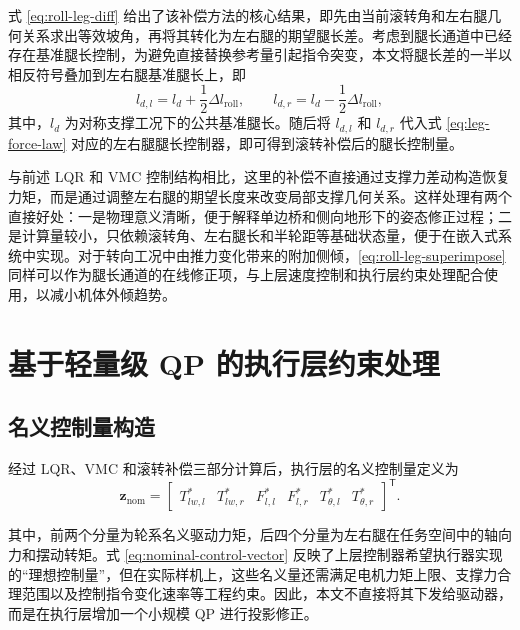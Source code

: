 式 \eqref{eq:roll-leg-diff} 给出了该补偿方法的核心结果，即先由当前滚转角和左右腿几何关系求出等效坡角，再将其转化为左右腿的期望腿长差。考虑到腿长通道中已经存在基准腿长控制，为避免直接替换参考量引起指令突变，本文将腿长差的一半以相反符号叠加到左右腿基准腿长上，即
\begin{equation}
  l_{d,l} = l_d + \frac{1}{2}\Delta l_{\mathrm{roll}},
  \qquad
  l_{d,r} = l_d - \frac{1}{2}\Delta l_{\mathrm{roll}},
  \label{eq:roll-leg-superimpose}
\end{equation}
其中，$l_d$ 为对称支撑工况下的公共基准腿长。随后将 $l_{d,l}$ 和 $l_{d,r}$ 代入式 \eqref{eq:leg-force-law} 对应的左右腿腿长控制器，即可得到滚转补偿后的腿长控制量。

与前述 LQR 和 VMC 控制结构相比，这里的补偿不直接通过支撑力差动构造恢复力矩，而是通过调整左右腿的期望长度来改变局部支撑几何关系。这样处理有两个直接好处：一是物理意义清晰，便于解释单边桥和侧向地形下的姿态修正过程；二是计算量较小，只依赖滚转角、左右腿长和半轮距等基础状态量，便于在嵌入式系统中实现。对于转向工况中由推力变化带来的附加侧倾，\eqref{eq:roll-leg-superimpose} 同样可以作为腿长通道的在线修正项，与上层速度控制和执行层约束处理配合使用，以减小机体外倾趋势。

\section{基于轻量级 QP 的执行层约束处理}

\subsection{名义控制量构造}

经过 LQR、VMC 和滚转补偿三部分计算后，执行层的名义控制量定义为
\begin{equation}
  \boldsymbol{z}_{\mathrm{nom}}
  =
  \begin{bmatrix}
    T_{lw,l}^{\ast} &
    T_{lw,r}^{\ast} &
    F_{l,l}^{\ast} &
    F_{l,r}^{\ast} &
    T_{\theta,l}^{\ast} &
    T_{\theta,r}^{\ast}
  \end{bmatrix}^{\mathsf{T}}.
  \label{eq:nominal-control-vector}
\end{equation}

其中，前两个分量为轮系名义驱动力矩，后四个分量为左右腿在任务空间中的轴向力和摆动转矩。式 \eqref{eq:nominal-control-vector} 反映了上层控制器希望执行器实现的“理想控制量”，但在实际样机上，这些名义量还需满足电机力矩上限、支撑力合理范围以及控制指令变化速率等工程约束。因此，本文不直接将其下发给驱动器，而是在执行层增加一个小规模 QP 进行投影修正。

